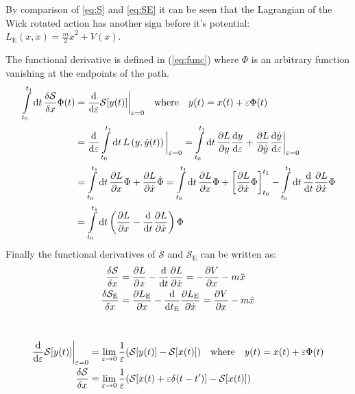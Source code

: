\documentclass[11pt,a4paper]{scrartcl}
\newcommand{\action}{\ensuremath{\mathcal{S}}}
\begin{document}
\noindent By comparison of \cref{eq:S} and \cref{eq:SE} it can be seen that the Lagrangian of the Wick rotated action has another sign before it's potential: $L_\mathrm{E}(x,\dot{x})=\frac{m}{2} \dot{x}^2+V(x)$.

\vspace{2\baselineskip}
\noindent The functional derivative is defined in (\ref{eq:func}) where $\Phi$ is an arbitrary function vanishing at the endpoints of the path.
\begin{align}{}
    \int\limits_{t_0}^{t_1} \dd{t} \fdv{\action}{x} \Phi (t) &= \dv{\varepsilon} \action [y(t)]\bigg|_{\varepsilon = 0}\quad \text{where} \quad y(t) = x(t) + \varepsilon \Phi(t) \label{eq:func}\\
    &= \dv{\varepsilon} \int\limits_{t_0}^{t_1}\dd{t}L\left(y, \dot{y}(t)\right)\bigg|_{\varepsilon = 0} = \int\limits_{t_0}^{t_1}\dd{t}\pdv{L}{y}\dv{y}{\varepsilon} + \pdv{L}{\dot{y}}\dv{\dot{y}}{\varepsilon}\bigg|_{\varepsilon = 0}\\
    &= \int\limits_{t_0}^{t_1}\dd{t}\pdv{L}{x}\Phi + \pdv{L}{\dot{x}}\dot{\Phi} = \int\limits_{t_0}^{t_1}\dd{t}\pdv{L}{x}\Phi + \left[ \pdv{L}{\dot{x}} \Phi\right]_{t_0}^{t_1}- \int \limits_{t_0}^{t_1} \dd{t} \dv{t}\pdv{L}{\dot{x}}\Phi\\
    &= \int\limits_{t_0}^{t_1}\dd{t}\left( \pdv{L}{x} - \dv{t}\pdv{L}{\dot{x}} \right)\Phi
\end{align}
Finally the functional derivatives of $\action$ and $\action_\mathrm{E}$ can be written as:
\begin{align}{}
    \fdv{\action}{x}&= \pdv{L}{x} - \dv{t} \pdv{L}{\dot{x}} = - \pdv{V}{x} - m \ddot{x}\\
    \fdv{\action_\mathrm{E}}{x}&= \pdv{L_\mathrm{E}}{x} - \dv{t_\mathrm{E}} \pdv{L_\mathrm{E}}{\dot{x}} = \pdv{V}{x} - m \ddot{x}
\end{align}{}
\\

\begin{align}
    \dv{\varepsilon} \action [y(t)]\bigg|_{\varepsilon = 0} &= \lim_{\varepsilon \to 0} \frac{1}{\varepsilon}(\action[y(t)] - \action[x(t)])\quad \text{where} \quad y(t) = x(t) + \varepsilon \Phi(t)\\
    \fdv{\action}{x}&= \lim_{\varepsilon \to 0} \frac{1}{\varepsilon}(\action[x(t) + \varepsilon \delta (t-t')] - \action[x(t)])\label{eq:deltafunc}
\end{align}{}
\end{document}
